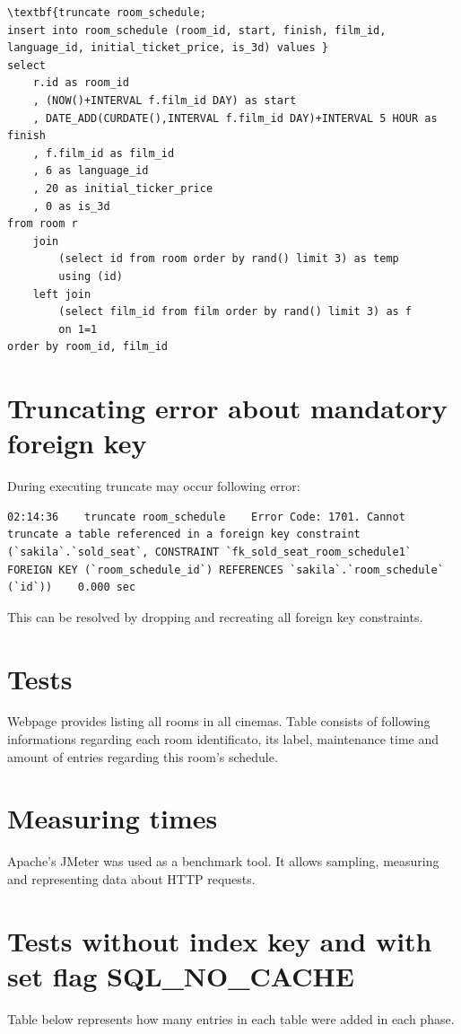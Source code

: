 \documentclass[10pt,a4paper]{article}
\begin{document}
\lstset{language=SQL}
\begin{lstlisting}[frame=single]
\textbf{truncate room_schedule;
insert into room_schedule (room_id, start, finish, film_id, language_id, initial_ticket_price, is_3d) values }
select
    r.id as room_id
    , (NOW()+INTERVAL f.film_id DAY) as start
    , DATE_ADD(CURDATE(),INTERVAL f.film_id DAY)+INTERVAL 5 HOUR as finish
    , f.film_id as film_id
    , 6 as language_id
    , 20 as initial_ticker_price
    , 0 as is_3d
from room r
    join
        (select id from room order by rand() limit 3) as temp
        using (id)
    left join
        (select film_id from film order by rand() limit 3) as f
        on 1=1
order by room_id, film_id
\end{lstlisting}

\section{Truncating error about mandatory foreign key}
During executing truncate may occur following error: 
\lstset{language=SQL}
\begin{lstlisting}[frame=single]
02:14:36    truncate room_schedule    Error Code: 1701. Cannot truncate a table referenced in a foreign key constraint (`sakila`.`sold_seat`, CONSTRAINT `fk_sold_seat_room_schedule1` FOREIGN KEY (`room_schedule_id`) REFERENCES `sakila`.`room_schedule` (`id`))    0.000 sec
\end{lstlisting}
This can be resolved by dropping and recreating all foreign key constraints. 

\section{Tests}
Webpage provides listing all rooms in all cinemas. Table consists of following informations regarding each room identificato, its label, maintenance time and amount of entries regarding this room’s schedule. 
\section{Measuring times}
Apache’s JMeter was used as a benchmark tool. It allows sampling, measuring and representing data about HTTP requests. 
\section{Tests without index key and with set flag SQL\_NO\_CACHE}
Table below represents how many entries in each table were added in each phase. 
\end{document}
